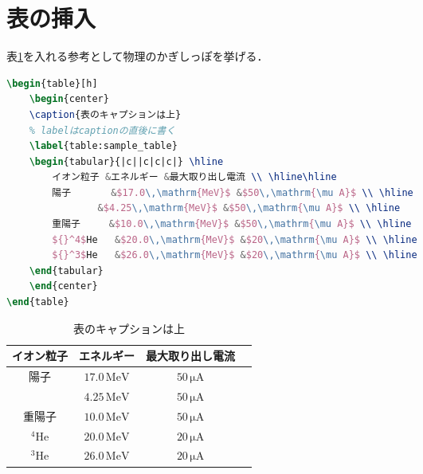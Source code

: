 \documentclass[11pt,a4paper]{jsarticle}
\begin{document}
\newpage

\section{表の挿入}
表\ref{table:sample_table}を入れる参考として物理のかぎしっぽ\cite{buturi}を挙げる．

\begin{lstlisting}[language = TeX]
\begin{table}[h]
    \begin{center}
    \caption{表のキャプションは上}
    % labelはcaptionの直後に書く
    \label{table:sample_table}
    \begin{tabular}{|c||c|c|c|} \hline
        イオン粒子 &エネルギー &最大取り出し電流 \\ \hline\hline
        陽子       &$17.0\,\mathrm{MeV}$ &$50\,\mathrm{\mu A}$ \\ \hline
                &$4.25\,\mathrm{MeV}$ &$50\,\mathrm{\mu A}$ \\ \hline
        重陽子     &$10.0\,\mathrm{MeV}$ &$50\,\mathrm{\mu A}$ \\ \hline
        ${}^4$He   &$20.0\,\mathrm{MeV}$ &$20\,\mathrm{\mu A}$ \\ \hline
        ${}^3$He   &$26.0\,\mathrm{MeV}$ &$20\,\mathrm{\mu A}$ \\ \hline
    \end{tabular}
    \end{center}
\end{table}
\end{lstlisting}
\begin{table}[h]
    \begin{center}
    \caption{表のキャプションは上}
    \label{table:sample_table}
    \begin{tabular}{|c||c|c|c|} \hline
        イオン粒子 &エネルギー &最大取り出し電流 \\ \hline\hline
        陽子       &$17.0\,\mathrm{MeV}$ &$50\,\mathrm{\mu A}$ \\ \hline
                &$4.25\,\mathrm{MeV}$ &$50\,\mathrm{\mu A}$ \\ \hline
        重陽子     &$10.0\,\mathrm{MeV}$ &$50\,\mathrm{\mu A}$ \\ \hline
        ${}^4$He   &$20.0\,\mathrm{MeV}$ &$20\,\mathrm{\mu A}$ \\ \hline
        ${}^3$He   &$26.0\,\mathrm{MeV}$ &$20\,\mathrm{\mu A}$ \\ \hline
    \end{tabular}
    \end{center}
\end{table}
\end{document}
